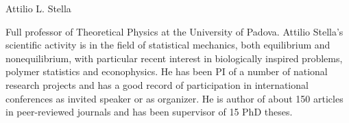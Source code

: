 \begin{participant}[type=PI,PM=8,gender=male]{Attilio L. Stella}

Full professor of Theoretical Physics at the University
of Padova. Attilio Stella's scientific activity is in the field of statistical mechanics,
both equilibrium and nonequilibrium, with particular recent interest in biologically 
inspired problems, polymer statistics and econophysics. He has been PI 
of a number of national research projects and has a good record of participation
in international conferences as invited speaker or as organizer. He is author of about
150 articles in peer-reviewed journals and has been supervisor of 15 PhD theses.

\end{participant}


